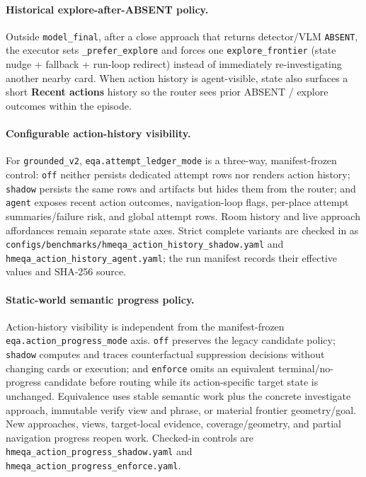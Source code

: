 \paragraph{Historical explore-after-ABSENT policy.}
Outside \texttt{model\_final}, after a close approach that returns detector/VLM \texttt{ABSENT}, the executor sets \texttt{\_prefer\_explore} and forces one \texttt{explore\_frontier} (state nudge + fallback + run-loop redirect) instead of immediately re-investigating another nearby card.
When action history is agent-visible, state also surfaces a short \textbf{Recent actions} history so the router sees prior ABSENT / explore outcomes within the episode.

\paragraph{Configurable action-history visibility.}
For \texttt{grounded\_v2}, \texttt{eqa.attempt\_ledger\_mode} is a three-way,
manifest-frozen control: \texttt{off} neither persists dedicated attempt rows nor
renders action history; \texttt{shadow} persists the same rows and artifacts but
hides them from the router; and \texttt{agent} exposes recent action outcomes,
navigation-loop flags, per-place attempt summaries/failure risk, and global
attempt rows. Room history and live approach affordances remain separate state
axes. Strict complete variants are checked in as
\texttt{configs/benchmarks/hmeqa\_action\_history\_shadow.yaml} and
\texttt{hmeqa\_action\_history\_agent.yaml}; the run manifest records their
effective values and SHA-256 source.

\paragraph{Static-world semantic progress policy.}
Action-history visibility is independent from the manifest-frozen
\texttt{eqa.action\_progress\_mode} axis. \texttt{off} preserves the legacy
candidate policy; \texttt{shadow} computes and traces counterfactual
suppression decisions without changing cards or execution; and
\texttt{enforce} omits an equivalent terminal/no-progress candidate before
routing while its action-specific target state is unchanged. Equivalence uses
stable semantic work plus the concrete investigate approach, immutable verify
view and phrase, or material frontier geometry/goal. New approaches, views,
target-local evidence, coverage/geometry, and partial navigation progress
reopen work. Checked-in controls are
\texttt{hmeqa\_action\_progress\_shadow.yaml} and
\texttt{hmeqa\_action\_progress\_enforce.yaml}.

